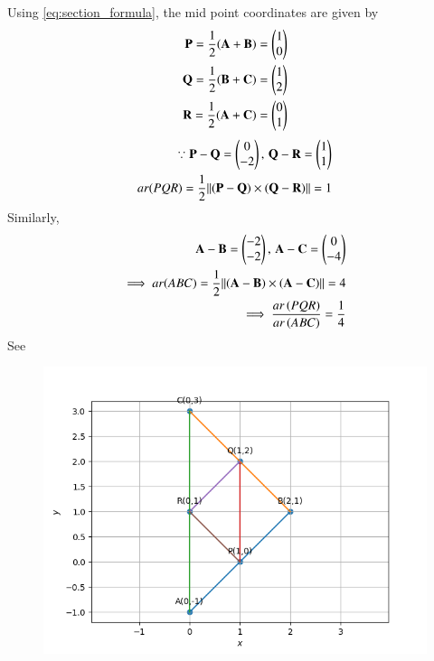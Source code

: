 Using 
	  \eqref{eq:section_formula},
the mid point coordinates are given by
	\begin{align}
		\mathbf{P} = \frac{1}{2}\mathbf(\mathbf{A}+\mathbf{B})  = \begin{pmatrix}1\\0\end{pmatrix}\\
		\mathbf{Q} = \frac{1}{2}\mathbf(\mathbf{B}+\mathbf{C}) = \begin{pmatrix}1\\2\end{pmatrix}\\
		\mathbf{R} = \frac{1}{2}\mathbf(\mathbf{A}+\mathbf{C}) = \begin{pmatrix}0\\1\end{pmatrix}
	\end{align}
	\begin{align}
\because		\mathbf{P}-\mathbf{Q} =  \begin{pmatrix}
 0 \\
 -2 
 \end{pmatrix},\,
		\mathbf{Q}-\mathbf{R} =   \begin{pmatrix}
 1 \\
 1 
 \end{pmatrix}
 \\
		ar(PQR)=\frac{1}{2}{\left\lVert\mathbf(\mathbf{P}-\mathbf{Q})\times\mathbf(\mathbf{Q}-\mathbf{R})\right\rVert}
		=1
	\end{align}
	Similarly, 
	\begin{align}
		\mathbf{A}-\mathbf{B} = \begin{pmatrix}
 -2 \\
 -2 
 \end{pmatrix}
 ,\,
		\mathbf{A}-\mathbf{C} =  \begin{pmatrix}
 0 \\
 -4 
 \end{pmatrix}
 \\
 \implies
		ar(ABC)=\frac{1}{2}{\left\lVert\mathbf(\mathbf{A}-\mathbf{B})\times\mathbf(\mathbf{A}-\mathbf{C})\right\rVert}
=4
\\
		\implies \frac{ar\left(PQR\right)}{ar\left(ABC\right)} = \frac{1}{4}
	\end{align}
	See 
\begin{figure}[!h]
	\begin{center} 
	    \includegraphics[width=\columnwidth]{chapters/10/7/3/3/figs/trigraph.png}
	\end{center}
\caption{}
\label{fig:10/7/3/3Fig}
\end{figure}
